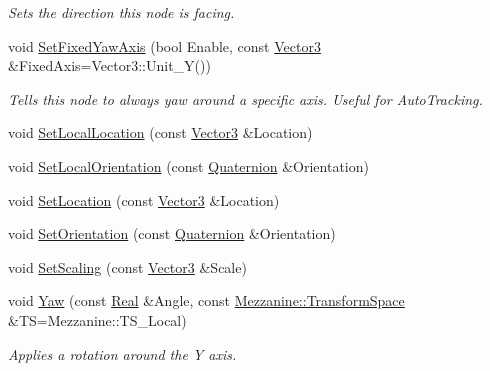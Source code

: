 \begin{DoxyCompactItemize}
\begin{DoxyCompactList}\small\item\em Sets the direction this node is facing. \item\end{DoxyCompactList}\item 
void \hyperlink{classMezzanine_1_1WorldNode_a3d4066a1b9f9862ea026f15dfa3a3e81}{SetFixedYawAxis} (bool Enable, const \hyperlink{classMezzanine_1_1Vector3}{Vector3} \&FixedAxis=Vector3::Unit\_\-Y())
\begin{DoxyCompactList}\small\item\em Tells this node to always yaw around a specific axis. Useful for AutoTracking. \item\end{DoxyCompactList}\item 
void \hyperlink{classMezzanine_1_1WorldNode_a03feb41f719612123fe8d9055603efe6}{SetLocalLocation} (const \hyperlink{classMezzanine_1_1Vector3}{Vector3} \&Location)
\item 
void \hyperlink{classMezzanine_1_1WorldNode_a32259918c2d5695141371ca364a813c2}{SetLocalOrientation} (const \hyperlink{classMezzanine_1_1Quaternion}{Quaternion} \&Orientation)
\item 
void \hyperlink{classMezzanine_1_1WorldNode_a636852458b226f1c2f3089f17558e678}{SetLocation} (const \hyperlink{classMezzanine_1_1Vector3}{Vector3} \&Location)
\item 
void \hyperlink{classMezzanine_1_1WorldNode_afe9db5c3abeb608bf2d589c2a61da546}{SetOrientation} (const \hyperlink{classMezzanine_1_1Quaternion}{Quaternion} \&Orientation)
\item 
void \hyperlink{classMezzanine_1_1WorldNode_a3f7797ef81aaf763cdf011728f6b6b05}{SetScaling} (const \hyperlink{classMezzanine_1_1Vector3}{Vector3} \&Scale)
\item 
void \hyperlink{classMezzanine_1_1WorldNode_a07ee43210a28041f2debf1cea0c5ce2a}{Yaw} (const \hyperlink{namespaceMezzanine_a726731b1a7df72bf3583e4a97282c6f6}{Real} \&Angle, const \hyperlink{namespaceMezzanine_ad81c74de3529f1e643bd145173924ed3}{Mezzanine::TransformSpace} \&TS=Mezzanine::TS\_\-Local)
\begin{DoxyCompactList}\small\item\em Applies a rotation around the Y axis. \item\end{DoxyCompactList}\end{DoxyCompactItemize}
